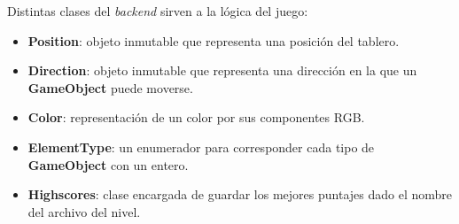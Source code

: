 \documentclass[a4paper,12pt,titlepage]{article}
\begin{document}
Distintas clases del \emph{backend} sirven a la lógica del juego:

\begin{itemize}
    \item \textbf{Position}: objeto inmutable que representa una posición del tablero.
    \item \textbf{Direction}: objeto inmutable que representa una dirección en la que un \textbf{GameObject} puede moverse.
    \item \textbf{Color}: representación de un color por sus componentes RGB.
    \item \textbf{ElementType}: un enumerador para corresponder cada tipo de \textbf{GameObject} con un entero.
	\item \textbf{Highscores}: clase encargada de guardar los mejores puntajes dado el nombre del archivo del nivel.
\end{itemize}
\end{document}
